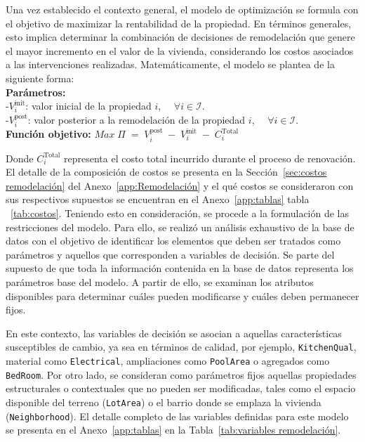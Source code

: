 Una vez establecido el contexto general, el modelo de optimización se formula con el objetivo de maximizar la rentabilidad de la propiedad. En términos generales, esto implica determinar la combinación de decisiones de remodelación que genere el mayor incremento en el valor de la vivienda, considerando los costos asociados a las intervenciones realizadas. Matemáticamente, el modelo se plantea de la siguiente forma:\\
\textbf{Parámetros:}\\
     -$V^{\text{init}}_i$: valor inicial de la propiedad $i$, $\quad \forall i \in \mathcal{I}$.\\
    -$V^{\text{post}}_i$: valor posterior a la remodelación de la propiedad $i$, $\quad \forall i \in \mathcal{I}$.\\
 \textbf{Función objetivo:}
    $Max \; \Pi \;=\; V^{\text{post}}_i \;-\; V^{\text{init}}_i \;-\; C^{\text{Total}}_{i}$


Donde $C^{\text{Total}}_{i}$ representa el costo total incurrido durante el proceso de renovación. El detalle de la composición de costos se presenta en la Sección~\ref{sec:costos remodelación} del Anexo~\ref{app:Remodelación} y el qué costos se consideraron con sus respectivos supuestos se encuentran en el Anexo~\ref{app:tablas} tabla ~\ref{tab:costos}. Teniendo esto en consideración, se procede a la formulación de las restricciones del modelo. Para ello, se realizó un análisis exhaustivo de la base de datos con el objetivo de identificar los elementos que deben ser tratados como parámetros y aquellos que corresponden a variables de decisión. Se parte del supuesto de que toda la información contenida en la base de datos representa los parámetros base del modelo. A partir de ello, se examinan los atributos disponibles para determinar cuáles pueden modificarse y cuáles deben permanecer fijos.

En este contexto, las variables de decisión se asocian a aquellas características susceptibles de cambio, ya sea en términos de calidad, por ejemplo, \texttt{KitchenQual}, material como \texttt{Electrical}, ampliaciones como \texttt{PoolArea} o agregados como \texttt{BedRoom}. Por otro lado, se consideran como parámetros fijos aquellas propiedades estructurales o contextuales que no pueden ser modificadas, tales como el espacio disponible del terreno (\texttt{LotArea}) o el barrio donde se emplaza la vivienda (\texttt{Neighborhood}). El detalle completo de las variables definidas para este modelo se presenta en el Anexo~\ref{app:tablas} en la Tabla~\ref{tab:variables remodelación}.

